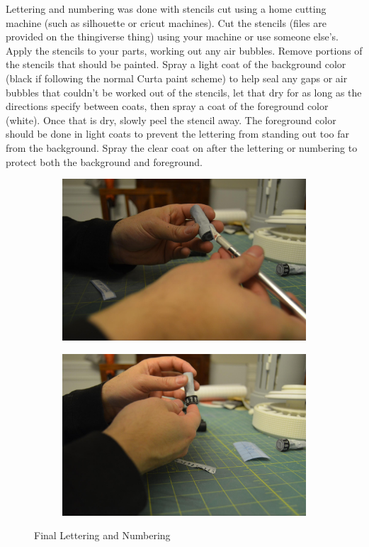 \documentclass[openany]{book}
\begin{document}
Lettering and numbering was done with stencils cut using a home cutting machine (such as silhouette or cricut machines). Cut the stencils (files are provided on the thingiverse thing) using your machine or use someone else’s. Apply the stencils to your parts, working out any air bubbles. Remove portions of the stencils that should be painted. Spray a light coat of the background color (black if following the normal Curta paint scheme) to help seal any gaps or air bubbles that couldn’t be worked out of the stencils, let that dry for as long as the directions specify between coats, then spray a coat of the foreground color (white). Once that is dry, slowly peel the stencil away. The foreground color should be done in light coats to prevent the lettering from standing out too far from the background. Spray the clear coat on after the lettering or numbering to protect both the background and foreground.


\begin{figure}[!ht]
	\centering
	\begin{subfigure}{.4\textwidth}
		\centering
		\includegraphics[width=.95\textwidth]{images/image36.jpg}
		\label{fig:image36}	
	\end{subfigure}
	\begin{subfigure}{.4\textwidth}
		\centering
		\includegraphics[width=.95\textwidth]{images/image35.jpg}
		\label{fig:image35}	
	\end{subfigure}
	\caption{Final Lettering and Numbering}
\end{figure}
\end{document}

